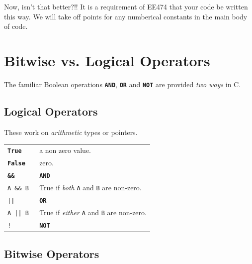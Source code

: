 Now, isn't that better?!!
%
It is a requirement of EE474 that
your code be written this way.
%
We will take off points for
any numberical constants in the main body of code.


\section{Bitwise vs. Logical Operators}

The familiar Boolean
operations {\tt\bf AND}, {\tt\bf OR}  and  {\tt\bf NOT}
are provided {\em two ways} in C.


\subsection{Logical Operators}

These work on {\em arithmetic } types or pointers.

\begin{tabular}{l p{1.5in} }

{\tt\bf True}           & a non zero value. \\

{\tt\bf False}          & zero.           \\

{\tt\bf \&\&}           & {\tt\bf AND}     \\

{\tt A \&\& B }         & True if {\it both} {\tt A} and {\tt B} are non-zero. \\

{\tt ||}                &  {\tt\bf OR} \\

{\tt A || B }           &  True if {\it either} {\tt A} and {\tt B} are non-zero.\\

{\tt ! }                &   {\tt\bf NOT} \\

\end{tabular}



\subsection{Bitwise Operators}

